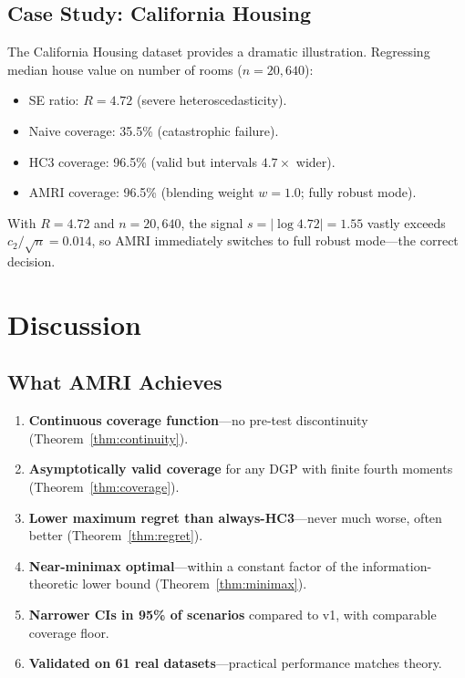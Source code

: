 \documentclass[12pt]{article}
\theoremstyle{definition}
\theoremstyle{remark}
\begin{document}
\subsection{Case Study: California Housing}

The California Housing dataset provides a dramatic illustration. Regressing median house value on number of rooms ($n = 20{,}640$):
\begin{itemize}[nosep]
\item SE ratio: $R = 4.72$ (severe heteroscedasticity).
\item Naive coverage: 35.5\% (catastrophic failure).
\item HC3 coverage: 96.5\% (valid but intervals $4.7\times$ wider).
\item AMRI coverage: 96.5\% (blending weight $w = 1.0$; fully robust mode).
\end{itemize}
With $R = 4.72$ and $n = 20{,}640$, the signal $s = |\log 4.72| = 1.55$ vastly exceeds $c_2/\sqrt{n} = 0.014$, so AMRI immediately switches to full robust mode---the correct decision.


\section{Discussion}\label{sec:discussion}

\subsection{What AMRI Achieves}

\begin{enumerate}[nosep]
\item \textbf{Continuous coverage function}---no pre-test discontinuity (Theorem~\ref{thm:continuity}).
\item \textbf{Asymptotically valid coverage} for any DGP with finite fourth moments (Theorem~\ref{thm:coverage}).
\item \textbf{Lower maximum regret than always-HC3}---never much worse, often better (Theorem~\ref{thm:regret}).
\item \textbf{Near-minimax optimal}---within a constant factor of the information-theoretic lower bound (Theorem~\ref{thm:minimax}).
\item \textbf{Narrower CIs in 95\% of scenarios} compared to v1, with comparable coverage floor.
\item \textbf{Validated on 61 real datasets}---practical performance matches theory.
\end{enumerate}
\end{document}
